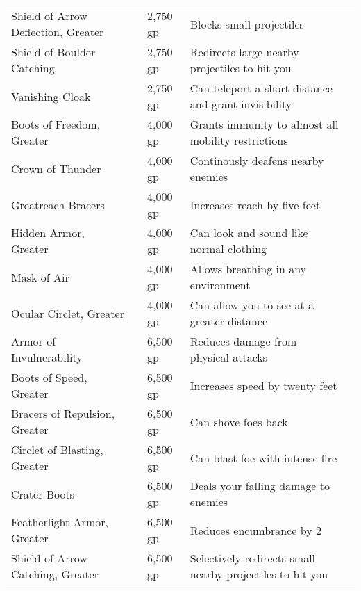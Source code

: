 \begin{longtabuwrapper}
\begin{longtabu}{l l l X l}
Shield of Arrow Deflection, Greater &  & 2,750 gp & Blocks small projectiles & \pageref{item:Shield of Arrow Deflection, Greater} \\
Shield of Boulder Catching &  & 2,750 gp & Redirects large nearby projectiles to hit you & \pageref{item:Shield of Boulder Catching} \\
Vanishing Cloak &  & 2,750 gp & Can teleport a short distance and grant invisibility & \pageref{item:Vanishing Cloak} \\
Boots of Freedom, Greater &  & 4,000 gp & Grants immunity to almost all mobility restrictions & \pageref{item:Boots of Freedom, Greater} \\
Crown of Thunder &  & 4,000 gp & Continously deafens nearby enemies & \pageref{item:Crown of Thunder} \\
Greatreach Bracers &  & 4,000 gp & Increases reach by five feet & \pageref{item:Greatreach Bracers} \\
Hidden Armor, Greater &  & 4,000 gp & Can look and sound like normal clothing & \pageref{item:Hidden Armor, Greater} \\
Mask of Air &  & 4,000 gp & Allows breathing in any environment & \pageref{item:Mask of Air} \\
Ocular Circlet, Greater &  & 4,000 gp & Can allow you to see at a greater distance & \pageref{item:Ocular Circlet, Greater} \\
Armor of Invulnerability &  & 6,500 gp & Reduces damage from physical attacks & \pageref{item:Armor of Invulnerability} \\
Boots of Speed, Greater &  & 6,500 gp & Increases speed by twenty feet & \pageref{item:Boots of Speed, Greater} \\
Bracers of Repulsion, Greater &  & 6,500 gp & Can shove foes back & \pageref{item:Bracers of Repulsion, Greater} \\
Circlet of Blasting, Greater &  & 6,500 gp & Can blast foe with intense fire & \pageref{item:Circlet of Blasting, Greater} \\
Crater Boots &  & 6,500 gp & Deals your falling damage to enemies & \pageref{item:Crater Boots} \\
Featherlight Armor, Greater &  & 6,500 gp & Reduces encumbrance by 2 & \pageref{item:Featherlight Armor, Greater} \\
Shield of Arrow Catching, Greater &  & 6,500 gp & Selectively redirects small nearby projectiles to hit you & \pageref{item:Shield of Arrow Catching, Greater} \\

\end{longtabu}
\end{longtabuwrapper}
